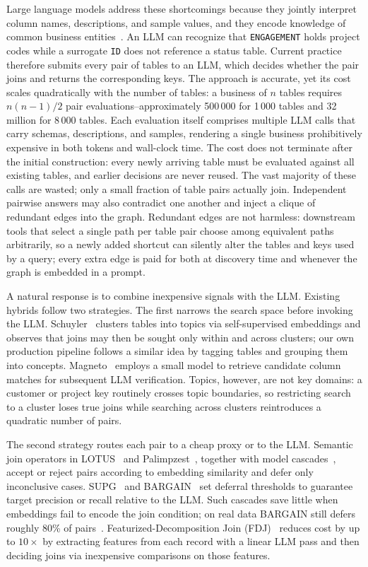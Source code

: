 Large language models address these shortcomings because they jointly interpret column names, descriptions, and sample values, and they encode knowledge of common business entities~\cite{dataWrangleNarayan2022}. An LLM can recognize that \texttt{ENGAGEMENT} holds project codes while a surrogate \texttt{ID} does not reference a status table. Current practice therefore submits every pair of tables to an LLM, which decides whether the pair joins and returns the corresponding keys. The approach is accurate, yet its cost scales quadratically with the number of tables: a business of $n$ tables requires $n(n-1)/2$ pair evaluations--approximately 500\,000 for 1\,000 tables and 32 million for 8\,000 tables. Each evaluation itself comprises multiple LLM calls that carry schemas, descriptions, and samples, rendering a single business prohibitively expensive in both tokens and wall-clock time. The cost does not terminate after the initial construction: every newly arriving table must be evaluated against all existing tables, and earlier decisions are never reused. The vast majority of these calls are wasted; only a small fraction of table pairs actually join. Independent pairwise answers may also contradict one another and inject a clique of redundant edges into the graph. Redundant edges are not harmless: downstream tools that select a single path per table pair choose among equivalent paths arbitrarily, so a newly added shortcut can silently alter the tables and keys used by a query; every extra edge is paid for both at discovery time and whenever the graph is embedded in a prompt.

A natural response is to combine inexpensive signals with the LLM. Existing hybrids follow two strategies. The first narrows the search space before invoking the LLM. Schuyler~\cite{Schuyler} clusters tables into topics via self-supervised embeddings and observes that joins may then be sought only within and across clusters; our own production pipeline follows a similar idea by tagging tables and grouping them into concepts. Magneto~\cite{Magneto} employs a small model to retrieve candidate column matches for subsequent LLM verification. Topics, however, are not key domains: a customer or project key routinely crosses topic boundaries, so restricting search to a cluster loses true joins while searching across clusters reintroduces a quadratic number of pairs.

The second strategy routes each pair to a cheap proxy or to the LLM. Semantic join operators in LOTUS~\cite{LOTUS} and Palimpzest~\cite{Palimpzest}, together with model cascades~\cite{FrugalGPT}, accept or reject pairs according to embedding similarity and defer only inconclusive cases. SUPG~\cite{SUPG} and BARGAIN~\cite{BARGAIN} set deferral thresholds to guarantee target precision or recall relative to the LLM. Such cascades save little when embeddings fail to encode the join condition; on real data BARGAIN still defers roughly 80\% of pairs~\cite{FDJ}. Featurized-Decomposition Join (FDJ)~\cite{FDJ} reduces cost by up to $10\times$ by extracting features from each record with a linear LLM pass and then deciding joins via inexpensive comparisons on those features.

